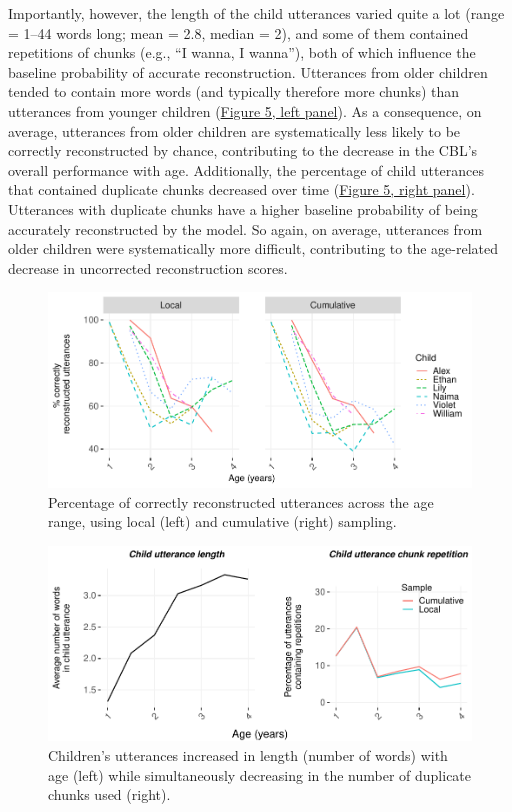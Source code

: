 \documentclass[
  english,
  man,floatsintext]{apa6}
\begin{document}
Importantly, however, the length of the child utterances varied quite a lot (range = 1--44 words long; mean = 2.8, median = 2), and some of them contained repetitions of chunks (e.g., \enquote{I wanna, I wanna}), both of which influence the baseline probability of accurate reconstruction. Utterances from older children tended to contain more words (and typically therefore more chunks) than utterances from younger children (\protect\hyperlink{fig5}{Figure 5, left panel}). As a consequence, on average, utterances from older children are systematically less likely to be correctly reconstructed by chance, contributing to the decrease in the CBL's overall performance with age. Additionally, the percentage of child utterances that contained duplicate chunks decreased over time (\protect\hyperlink{fig5}{Figure 5, right panel}). Utterances with duplicate chunks have a higher baseline probability of being accurately reconstructed by the model. So again, on average, utterances from older children were systematically more difficult, contributing to the age-related decrease in uncorrected reconstruction scores.

\begin{figure}
\includegraphics[width=0.95\linewidth]{CBL-age_invariance_files/figure-latex/fig4-1} \caption{Percentage of correctly reconstructed utterances across the age range, using local (left) and cumulative (right) sampling.}\label{fig:fig4}
\end{figure}

\begin{figure}
\includegraphics[width=0.95\linewidth]{CBL-age_invariance_files/figure-latex/fig5-1} \caption{Children's utterances increased in length (number of words) with age (left) while simultaneously decreasing in the number of duplicate chunks used (right).}\label{fig:fig5}
\end{figure}
\end{document}
